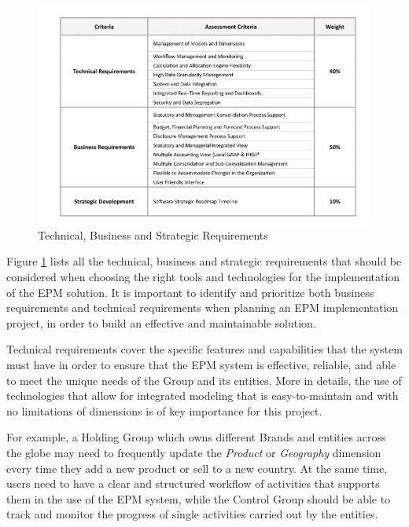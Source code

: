\documentclass[12pt,a4paper,openright,twoside]{book}
\begin{document}
\begin{figure}[ht]
	\centering
	\includegraphics[width=\linewidth]{figures/requirements.pdf}
	\caption{Technical, Business and Strategic Requirements}
	\label{fig:requirements}
\end{figure}

Figure \ref{fig:requirements} lists all the technical, business and strategic requirements that should be considered when choosing the right tools and technologies for the implementation of the EPM solution.
%
It is important to identify and prioritize both business requirements and technical requirements when planning an EPM implementation project, in order to build an effective and maintainable solution.

Technical requirements cover the specific features and capabilities that the system must have in order to ensure that the EPM system is effective, reliable, and able to meet the unique needs of the Group and its entities.
%
More in details, the use of technologies that allow for integrated modeling that is easy-to-maintain and with no limitations of dimensions is of key importance for this project.

For example, a Holding Group which owns different Brands and entities across the globe may need to frequently update the \textit{Product} or \textit{Geography} dimension every time they add a new product or sell to a new country.
%
At the same time, users need to have a clear and structured workflow of activities that supports them in the use of the EPM system, while the Control Group should be able to track and monitor the progress of single activities carried out by the entities.
\end{document}
